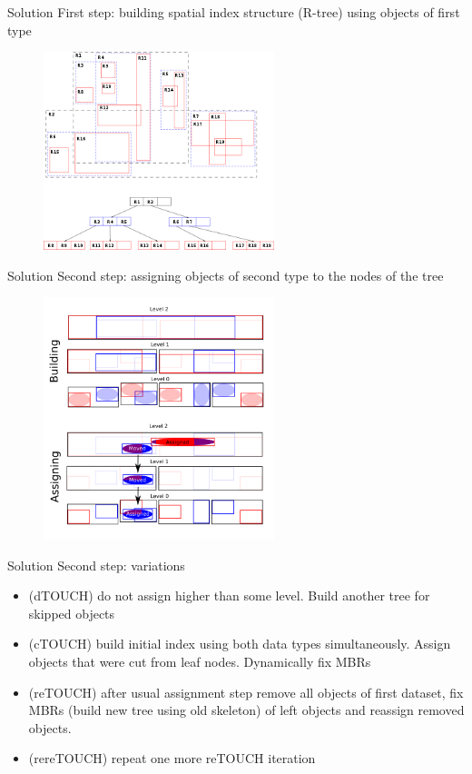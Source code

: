 \documentclass{beamer}
\begin{document}
\begin{frame}{Solution}
First step: building spatial index structure (R-tree) using objects of first type
\begin{figure}[p]
    \centering
    \includegraphics[width=0.6\textwidth]{Images/3dRtree.png}
\end{figure}
\end{frame}
\begin{frame}{Solution}
Second step: assigning objects of second type to the nodes of the tree
\begin{figure}[p]
    \centering
    \includegraphics[width=0.6\textwidth]{Images/cTOUCHexplain.png}
\end{figure}
\end{frame}
\begin{frame}{Solution}
Second step: variations
\begin{itemize}
\item (dTOUCH) do not assign higher than some level. Build another tree for skipped objects
\item (cTOUCH) build initial index using both data types simultaneously. Assign objects that were cut from leaf nodes. Dynamically fix MBRs
\item (reTOUCH) after usual assignment step remove all objects of first dataset, fix MBRs (build new tree using old skeleton) of left objects and reassign removed objects. 
\item (rereTOUCH) repeat one more reTOUCH iteration
\end{itemize}
\end{frame}
\end{document}
